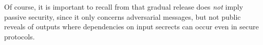 \leakjfig

Of course, it is important to recall from \cite{skalka-near-ppdp24}
that gradual release does \emph{not} imply passive security, since it
only concerns adversarial messages, but not public reveals of outputs
where dependencies on input secrects can occur even in secure
protocols.

\begin{comment}
\subsection{Examples}

\begin{verbatimtab}
m[s1]@2 := (s[1] - r[local] - r[x])@1
m[s1]@3 := r[x]@1

// m[s1]@2 : { c(r[x]@1, { c(r[local]@1, {s[1]@1} ) }
// m[s1]@3 : { r[x]@1 }
\end{verbatimtab}

\begin{verbatimtab}
m[x]@1 := s2(s[x],-r[x],r[x])@2

// m[x]@1 == s[x]@2 + -r[x]@2 
// m[x]@1 : { c(r[x]@2, { s[x]@2 }) } 

m[y]@1 := OT(s[y]@1,-r[y],r[y])@2

// m[y]@1 == s[y]@1 + -r[y]@2
// m[y]@1 : { c(r[y]@2, { s[y]@1 }) } 
\end{verbatimtab}
\end{comment}
